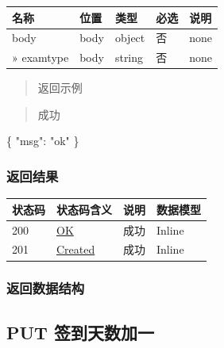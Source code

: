\documentclass[
]{article}
\newenvironment{Shaded}{}{}
\newcommand{\DataTypeTok}[1]{\textcolor[rgb]{0.56,0.13,0.00}{#1}}
\newcommand{\FunctionTok}[1]{\textcolor[rgb]{0.02,0.16,0.49}{#1}}
\newcommand{\StringTok}[1]{\textcolor[rgb]{0.25,0.44,0.63}{#1}}
\begin{document}
\begin{longtable}[]{@{}lllll@{}}
\toprule
名称 & 位置 & 类型 & 必选 & 说明 \\
\midrule
\endhead
body & body & object & 否 & none \\
» examtype & body & string & 否 & none \\
\bottomrule
\end{longtable}

\begin{quote}
返回示例
\end{quote}

\begin{quote}
成功
\end{quote}

\begin{Shaded}
\begin{Highlighting}[]
\FunctionTok{\{}
  \DataTypeTok{"msg"}\FunctionTok{:} \StringTok{"ok"}
\FunctionTok{\}}
\end{Highlighting}
\end{Shaded}

\hypertarget{ux8fd4ux56deux7ed3ux679c-38}{%
\subsubsection{返回结果}\label{ux8fd4ux56deux7ed3ux679c-38}}

\begin{longtable}[]{@{}llll@{}}
\toprule
状态码 & 状态码含义 & 说明 & 数据模型 \\
\midrule
\endhead
200 & \href{https://tools.ietf.org/html/rfc7231\#section-6.3.1}{OK} &
成功 & Inline \\
201 & \href{https://tools.ietf.org/html/rfc7231\#section-6.3.2}{Created}
& 成功 & Inline \\
\bottomrule
\end{longtable}

\hypertarget{ux8fd4ux56deux6570ux636eux7ed3ux6784-30}{%
\subsubsection{返回数据结构}\label{ux8fd4ux56deux6570ux636eux7ed3ux6784-30}}

\hypertarget{put-ux7b7eux5230ux5929ux6570ux52a0ux4e00}{%
\subsection{PUT
签到天数加一}\label{put-ux7b7eux5230ux5929ux6570ux52a0ux4e00}}
\end{document}
